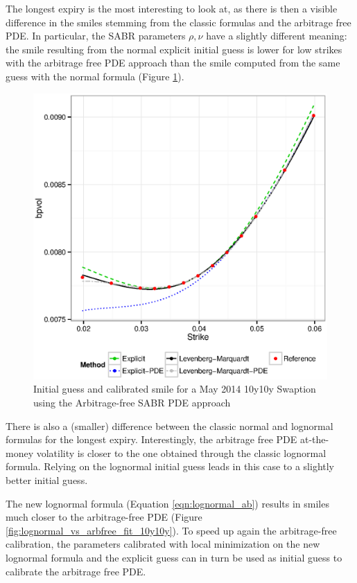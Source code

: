 \documentclass[]{rAMF2e}
\begin{document}
The longest expiry is the most interesting to look at, as there is then a visible difference in the smiles stemming from the classic formulas and the arbitrage free PDE. In particular, the SABR parameters $\rho, \nu$ have a slightly different meaning: the smile resulting from the normal explicit initial guess is lower for low strikes with the arbitrage free PDE approach than the smile computed from the same guess with the normal formula (Figure \ref{fig:normal_vs_arbfree_fit_10y10y}). 

\begin{figure}[hbp]
  \caption{\label{fig:normal_vs_arbfree_fit_10y10y}Initial guess and calibrated smile for a May 2014 10y10y Swaption using the Arbitrage-free SABR PDE approach }
\begin{center}
 \includegraphics[width=11.5cm]{normal_vs_arbfree_fit_10y10y.eps}
\end{center}
\end{figure}

There is also a (smaller) difference between the classic normal and lognormal formulas for the longest expiry. Interestingly, the arbitrage free PDE at-the-money volatility is closer to the one obtained through the classic lognormal formula. Relying on the lognormal initial guess leads in this case to a slightly better initial guess.

The new lognormal formula (Equation \ref{eqn:lognormal_ab}) results in smiles much closer to the arbitrage-free PDE (Figure \ref{fig:lognormal_vs_arbfree_fit_10y10y}). To speed up again the arbitrage-free calibration, the parameters calibrated with local minimization on the new lognormal formula and the explicit guess can in turn be used as initial guess to calibrate the arbitrage free PDE.
\end{document}
